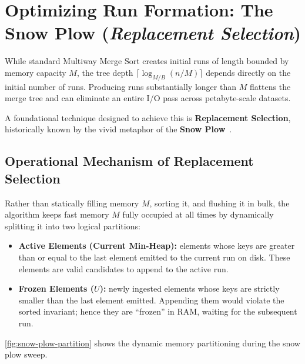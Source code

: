 \section{Optimizing Run Formation: The Snow Plow (\texorpdfstring{\emph{Replacement Selection}}{Replacement Selection})}
\label{sec:snow-plow}

While standard Multiway Merge Sort creates initial runs of length bounded by memory capacity $M$, the tree depth $\lceil \log_{M/B}(n/M) \rceil$ depends directly on the initial number of runs. Producing runs substantially longer than $M$ flattens the merge tree and can eliminate an entire I/O pass across petabyte-scale datasets.

A foundational technique designed to achieve this is \textbf{Replacement Selection}, historically known by the vivid metaphor of the \textbf{Snow Plow}~\cite{knuth1997}.

\subsection{Operational Mechanism of Replacement Selection}
\label{subsec:snow-plow-mechanism}

Rather than statically filling memory $M$, sorting it, and flushing it in bulk, the algorithm keeps fast memory $M$ fully occupied at all times by dynamically splitting it into two logical partitions:
\begin{itemize}
  \item \textbf{Active Elements (Current Min-Heap):} elements whose keys are greater than or equal to the last element emitted to the current run on disk. These elements are valid candidates to append to the active run.
  \item \textbf{Frozen Elements ($U$):} newly ingested elements whose keys are strictly smaller than the last element emitted. Appending them would violate the sorted invariant; hence they are ``frozen'' in RAM, waiting for the subsequent run.
\end{itemize}

\autoref{fig:snow-plow-partition} shows the dynamic memory partitioning during the snow plow sweep.

